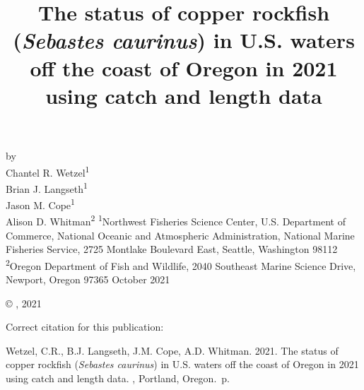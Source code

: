 \documentclass[11pt,
  english,
  a4paper,
]{article}
\date{}
\newcommand{\trTitle}{The status of copper rockfish (\emph{Sebastes caurinus}) in U.S. waters off the coast of Oregon in 2021 using catch and length data}
\newcommand{\trYear}{2021}
\newcommand{\trMonth}{October}
\newcommand{\trAuthsBack}{Wetzel, C.R., B.J. Langseth, J.M. Cope, A.D. Whitman}
\newcommand{\trCitation}{
\begin{hangparas}{1em}{1}
\trAuthsBack{}. \trYear{}. \trTitle{}. \glsentrylong{pfmc}, Portland, Oregon. \pageref{LastPage}{}\,p.
\end{hangparas}}
\begin{document}

\renewcommand*{\thefootnote}{\fnsymbol{footnote}}

\small
\thispagestyle{empty}
\noindent
\begin{center}
\title{The status of copper rockfish (\emph{Sebastes caurinus}) in U.S. waters off the coast of Oregon in 2021 using catch and length data}
\vspace{1.5cm}
{\Large\textbf{}}
\vfill
by\\
Chantel R. Wetzel\textsuperscript{1}\\
Brian J. Langseth\textsuperscript{1}\\
Jason M. Cope\textsuperscript{1}\\
Alison D. Whitman\textsuperscript{2}\vfill
\textsuperscript{1}Northwest Fisheries Science Center, U.S. Department of Commerce, National Oceanic and Atmospheric Administration, National Marine Fisheries Service, 2725 Montlake Boulevard East, Seattle, Washington 98112\\
\textsuperscript{2}Oregon Department of Fish and Wildlife, 2040 Southeast Marine Science Drive, Newport, Oregon 97365\vfill
\trMonth{} \trYear{}
\end{center}
\clearpage

\thispagestyle{empty}
\vspace*{\fill}
\begin{center}
\copyright{} , \trYear{}\\
\end{center}
\par
\bigskip
\noindent
Correct citation for this publication:
\bigskip
\par
\trCitation{}
\clearpage


\tableofcontents\clearpage
\label{TRlastRoman}
\clearpage

\newpage
\thispagestyle{empty} %

\pagestyle{plain}  %
\renewcommand*{\thefootnote}{\arabic{footnote}}  %
\setcounter{footnote}{0}  %
\renewcommand{\headrulewidth}{0.5pt}
\renewcommand{\footrulewidth}{0.5pt}
\end{document}
